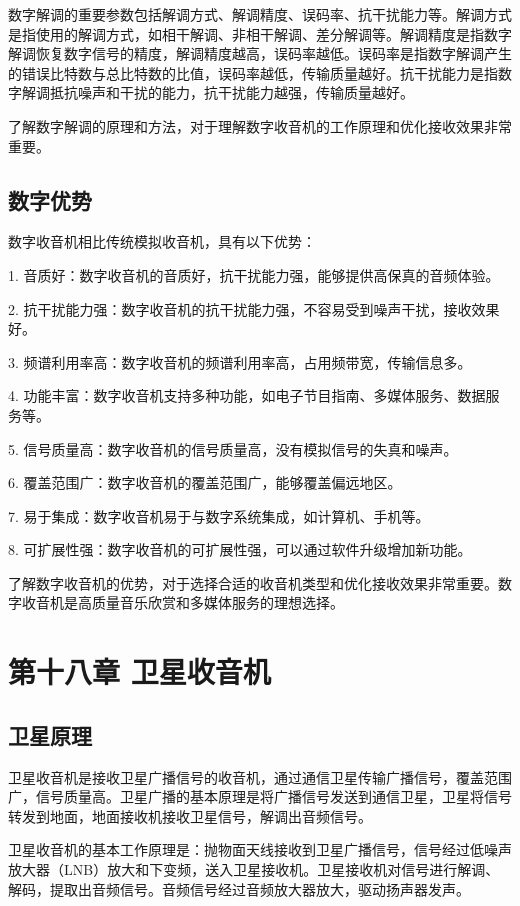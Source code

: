 \documentclass[12pt,UTF8]{ctexbook}
\begin{document}
数字解调的重要参数包括解调方式、解调精度、误码率、抗干扰能力等。解调方式是指使用的解调方式，如相干解调、非相干解调、差分解调等。解调精度是指数字解调恢复数字信号的精度，解调精度越高，误码率越低。误码率是指数字解调产生的错误比特数与总比特数的比值，误码率越低，传输质量越好。抗干扰能力是指数字解调抵抗噪声和干扰的能力，抗干扰能力越强，传输质量越好。

了解数字解调的原理和方法，对于理解数字收音机的工作原理和优化接收效果非常重要。

\section{数字优势}

数字收音机相比传统模拟收音机，具有以下优势：

1. 音质好：数字收音机的音质好，抗干扰能力强，能够提供高保真的音频体验。

2. 抗干扰能力强：数字收音机的抗干扰能力强，不容易受到噪声干扰，接收效果好。

3. 频谱利用率高：数字收音机的频谱利用率高，占用频带宽，传输信息多。

4. 功能丰富：数字收音机支持多种功能，如电子节目指南、多媒体服务、数据服务等。

5. 信号质量高：数字收音机的信号质量高，没有模拟信号的失真和噪声。

6. 覆盖范围广：数字收音机的覆盖范围广，能够覆盖偏远地区。

7. 易于集成：数字收音机易于与数字系统集成，如计算机、手机等。

8. 可扩展性强：数字收音机的可扩展性强，可以通过软件升级增加新功能。

了解数字收音机的优势，对于选择合适的收音机类型和优化接收效果非常重要。数字收音机是高质量音乐欣赏和多媒体服务的理想选择。

\chapter{第十八章 卫星收音机}

\section{卫星原理}

卫星收音机是接收卫星广播信号的收音机，通过通信卫星传输广播信号，覆盖范围广，信号质量高。卫星广播的基本原理是将广播信号发送到通信卫星，卫星将信号转发到地面，地面接收机接收卫星信号，解调出音频信号。

卫星收音机的基本工作原理是：抛物面天线接收到卫星广播信号，信号经过低噪声放大器（LNB）放大和下变频，送入卫星接收机。卫星接收机对信号进行解调、解码，提取出音频信号。音频信号经过音频放大器放大，驱动扬声器发声。
\end{document}
